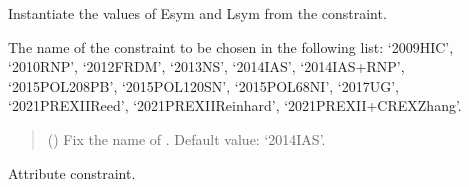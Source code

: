 \documentclass[letterpaper,10pt,english]{sphinxmanual}
\begin{document}
\begin{fulllineitems}
\label{\detokenize{source/api/setup_corr_EsymLsym:nucleardatapy.corr.setup_EsymLsym.setupEsymLsym}}
\pysigstartsignatures
{}
\pysigstopsignatures
\sphinxAtStartPar
Instantiate the values of Esym and Lsym from the constraint.

\sphinxAtStartPar
The name of the constraint to be chosen in the     following list: ‘2009\sphinxhyphen{}HIC’, ‘2010\sphinxhyphen{}RNP’, ‘2012\sphinxhyphen{}FRDM’, ‘2013\sphinxhyphen{}NS’,     ‘2014\sphinxhyphen{}IAS’, ‘2014\sphinxhyphen{}IAS+RNP’, ‘2015\sphinxhyphen{}POL\sphinxhyphen{}208PB’, ‘2015\sphinxhyphen{}POL\sphinxhyphen{}120SN’,     ‘2015\sphinxhyphen{}POL\sphinxhyphen{}68NI’, ‘2017\sphinxhyphen{}UG’, ‘2021\sphinxhyphen{}PREXII\sphinxhyphen{}Reed’,     ‘2021\sphinxhyphen{}PREXII\sphinxhyphen{}Reinhard’, ‘2021\sphinxhyphen{}PREXII+CREX\sphinxhyphen{}Zhang’.
\begin{quote}\begin{description}
\sphinxAtStartPar
{} (\sphinxstyleliteralemphasis{\sphinxupquote{, }}) \textendash{} Fix the name of . Default value: ‘2014\sphinxhyphen{}IAS’.

\end{description}\end{quote}

\sphinxAtStartPar
{}

\begin{fulllineitems}
\label{\detokenize{source/api/setup_corr_EsymLsym:nucleardatapy.corr.setup_EsymLsym.setupEsymLsym.constraint}}
\pysigstartsignatures
{}
\pysigstopsignatures
\sphinxAtStartPar
Attribute constraint.

\end{fulllineitems}


\end{fulllineitems}
\end{document}

